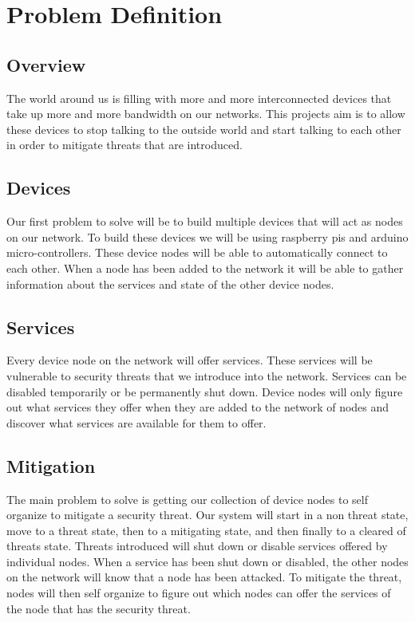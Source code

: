 \documentclass[onecolumn, draftclsnofoot,10pt, compsoc]{IEEEtran}
\begin{document}
\newpage
{}
\tableofcontents
\newpage

\section*{Problem Definition}
\subsection*{Overview}
The world around us is filling with more and more interconnected devices that take up more and more bandwidth on our networks. This projects aim is to allow these devices to stop talking to the outside world and start talking to each other in order to mitigate threats that are introduced.
\subsection*{Devices}
Our first problem to solve will be to build multiple devices that will act as nodes on our network. To build these devices we will be using raspberry pis and arduino micro-controllers. These device nodes will be able to automatically connect to each other. When a node has been added to the network it will be able to gather information about the services and state of the other device nodes.
\subsection*{Services}
Every device node on the network will offer services. These services will be vulnerable to security threats that we introduce into the network. Services can be disabled temporarily or be permanently shut down. Device nodes will only figure out what services they offer when they are added to the network of nodes and discover what services are available for them to offer.
\subsection*{Mitigation}
The main problem to solve is getting our collection of device nodes to self organize to mitigate a security threat. Our system will start in a non threat state, move to a threat state, then to a mitigating state, and then finally to a cleared of threats state. Threats introduced will shut down or disable services offered by individual nodes. When a service has been shut down or disabled, the other nodes on the network will know that a node has been attacked. To mitigate the threat, nodes will then self organize to figure out which nodes can offer the services of the node that has the security threat. 
\end{document}
